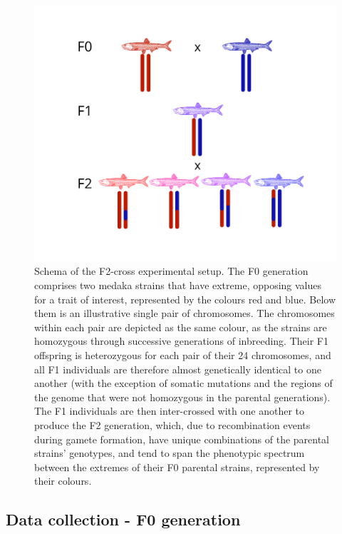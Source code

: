 \documentclass[
]{article}
\begin{document}
\begin{figure}
\includegraphics[width=1\linewidth]{figs/mikk_behaviour/F2-cross-schema} \caption{Schema of the F2-cross experimental setup. The F0 generation comprises two medaka strains that have extreme, opposing values for a trait of interest, represented by the colours red and blue. Below them is an illustrative single pair of chromosomes. The chromosomes within each pair are depicted as the same colour, as the strains are homozygous through successive generations of inbreeding. Their F1 offspring is heterozygous for each pair of their 24 chromosomes, and all F1 individuals are therefore almost genetically identical to one another (with the exception of somatic mutations and the regions of the genome that were not homozygous in the parental generations). The F1 individuals are then inter-crossed with one another to produce the F2 generation, which, due to recombination events during gamete formation, have unique combinations of the parental strains' genotypes, and tend to span the phenotypic spectrum between the extremes of their F0 parental strains, represented by their colours.}\label{fig:F2-cross-schema}
\end{figure}

\hypertarget{data-collection---f0-generation}{%
\subsection{Data collection - F0 generation}\label{data-collection---f0-generation}}
\end{document}
